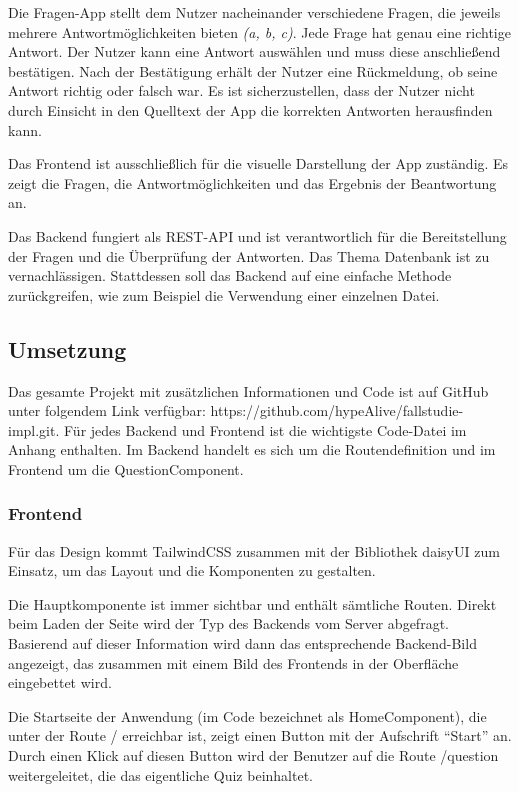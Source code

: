 \documentclass[biblatex]{lni}
\begin{document}
Die Fragen-App stellt dem Nutzer nacheinander verschiedene Fragen,
die jeweils mehrere Antwortmöglichkeiten bieten \textit{(a, b, c)}.
Jede Frage hat genau eine richtige Antwort.
Der Nutzer kann eine Antwort auswählen und muss diese anschließend bestätigen.
Nach der Bestätigung erhält der Nutzer eine Rückmeldung,
ob seine Antwort richtig oder falsch war.
Es ist sicherzustellen, dass der Nutzer nicht durch Einsicht in den Quelltext der App die korrekten Antworten herausfinden kann.

Das Frontend ist ausschließlich für die visuelle Darstellung der App zuständig.
Es zeigt die Fragen, die Antwortmöglichkeiten und das Ergebnis der Beantwortung an.

Das Backend fungiert als \ac{REST}-\ac{API} und ist verantwortlich für die Bereitstellung der Fragen und die Überprüfung der Antworten.
Das Thema Datenbank ist zu vernachlässigen.
Stattdessen soll das Backend auf eine einfache Methode zurückgreifen, wie zum Beispiel die Verwendung einer einzelnen Datei.

\subsection{Umsetzung}

Das gesamte Projekt mit zusätzlichen Informationen und Code ist auf GitHub unter folgendem Link verfügbar: https://github.com/hypeAlive/fallstudie-impl.git.
Für jedes Backend und Frontend ist die wichtigste Code-Datei im Anhang enthalten.
Im Backend handelt es sich um die Routendefinition und im Frontend um die QuestionComponent.

\subsubsection{Frontend}

Für das Design kommt TailwindCSS zusammen mit der Bibliothek daisyUI zum Einsatz,
um das Layout und die Komponenten zu gestalten.

Die Hauptkomponente ist immer sichtbar und enthält sämtliche Routen.
Direkt beim Laden der Seite wird der Typ des Backends vom Server abgefragt.
Basierend auf dieser Information wird dann das entsprechende Backend-Bild angezeigt,
das zusammen mit einem Bild des Frontends in der Oberfläche eingebettet wird.

Die Startseite der Anwendung (im Code bezeichnet als HomeComponent),
die unter der Route / erreichbar ist, zeigt einen Button mit der Aufschrift “Start” an.
Durch einen Klick auf diesen Button wird der Benutzer auf die Route /question weitergeleitet,
die das eigentliche Quiz beinhaltet.
\end{document}
